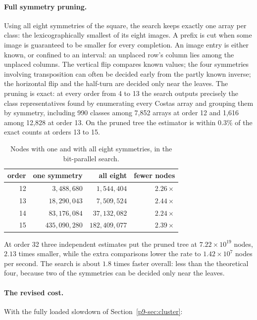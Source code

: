 \documentclass[11pt,a4paper,oneside]{report}
\theoremstyle{definition}
\begin{document}
\paragraph{Full symmetry pruning.} Using all eight symmetries of the square, the search keeps exactly one
array per class: the lexicographically smallest of its eight images. A prefix is cut when some image is
guaranteed to be smaller for every completion. An image entry is either known, or confined to an interval:
an unplaced row's column lies among the unplaced columns. The vertical flip compares known values; the four
symmetries involving transposition can often be decided early from the partly known inverse; the horizontal
flip and the half-turn are decided only near the leaves. The pruning is exact: at every order from 4 to
13 the search outputs precisely the class representatives found by enumerating every Costas array and
grouping them by symmetry, including 990 classes among 7{,}852 arrays at order 12 and 1{,}616 among 12{,}828
at order 13. On the pruned tree the estimator is within $0.3\%$ of the exact counts at orders 13 to 15.

\begin{table}[H]
\centering
\small
\begin{tabular}{@{}rrrr@{}}
\toprule
order & one symmetry & all eight & fewer nodes \\
\midrule
12 & $3{,}488{,}680$ & $1{,}544{,}404$ & $2.26\times$ \\
13 & $18{,}290{,}043$ & $7{,}509{,}524$ & $2.44\times$ \\
14 & $83{,}176{,}084$ & $37{,}132{,}082$ & $2.24\times$ \\
15 & $435{,}090{,}280$ & $182{,}409{,}077$ & $2.39\times$ \\
\bottomrule
\end{tabular}
\caption{Nodes with one and with all eight symmetries, in the bit-parallel search.}
\label{p9-tab:symmetry}
\end{table}

\noindent At order 32 three independent estimates put the pruned tree at $7.22\times10^{19}$ nodes, $2.13$
times smaller, while the extra comparisons lower the rate to $1.42\times10^7$ nodes per second. The search is
about $1.8$ times faster overall: less than the theoretical four, because two of the symmetries can be
decided only near the leaves.

\paragraph{The revised cost.} With the fully loaded slowdown of Section~\ref{p9-sec:cluster}:
\end{document}
